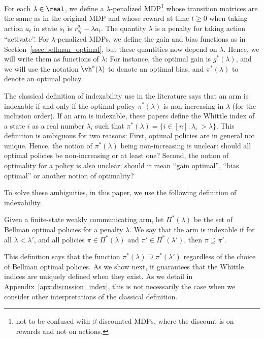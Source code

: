 For each $\lambda\in\real$, we define a $\lambda$-penalized MDP\footnote{not to be confused with $\beta$-discounted MDPs, where the discount is on rewards  and not on actions.} whose transition matrices are the same as in the original MDP and whose reward at time $t\ge0$ when taking action $a_t$ in state $s_t$ is $r^{a_t}_{s_t} - \lambda a_t$. The quantity $\lambda$ is a penalty for taking action ``activate''. For $\lambda$-penalized MDPs, we define the gain and bias functions as in Section~\ref{ssec:bellman_optimal}, but these quantities now depend on $\lambda$. Hence, we will write them as functions of $\lambda$: For instance, the optimal gain is $g^*(\lambda)$, and we will use the notation $\vh^*(\lambda)$ to denote an optimal bias, and $\pi^*(\lambda)$ to denote an optimal policy.

The classical definition of indexability use in the literature \cite{akbarzadeh2020conditions,nino2020fast,gibson2021novel,nakhleh2021neurwin} says that an arm is indexable if and only if the optimal policy $\pi^*(\lambda)$ is non-increasing in $\lambda$ (for the inclusion order). If an arm is indexable, these papers define the Whittle index of a state $i$ as a real number $\lambda_i$ such that ${\pi^*(\lambda)=\{i\in[n]: \lambda_i\ > \lambda\}}$.  This definition is ambiguous for two reasons: First, optimal policies are in general not unique. Hence, the notion of $\pi^*(\lambda)$ being non-increasing is unclear: should all optimal policies be non-increasing or at least one? Second, the notion of optimality for a policy  is also unclear: should it mean ``gain optimal'', ``bias optimal'' or another notion of optimality? 

To solve these ambiguities, in this paper, we use the following definition of indexability.  
\begin{defn}
    \label{defn:indexability}
    Given a finite-state weakly communicating arm, let $\Pi^*(\lambda)$ be the set of Bellman optimal policies for a penalty $\lambda$.
    We say that the arm is indexable if for all $\lambda<\lambda'$, and all policies $\pi\in\Pi^*(\lambda)$ and $\pi'\in\Pi^*(\lambda')$, then $\pi\supseteq\pi'$.
\end{defn}
This definition says that the function $\pi^*(\lambda)\supseteq\pi^*(\lambda')$ regardless of the choice of Bellman optimal policies. As we show next, it guarantees that the Whittle indices are uniquely defined when they exist. As we detail in Appendix~\ref{apx:discussion_index}, this is not necessarily the case when we consider other interpretations of the classical definition.

